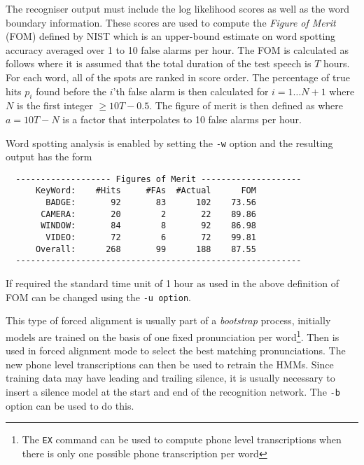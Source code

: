The recogniser output must include the log likelihood scores as
well as the word boundary information.  
These scores are used to compute the \textit{Figure of Merit} (FOM)
defined by NIST which is an upper-bound estimate on word spotting
accuracy averaged over 1 to 10 false alarms per hour.
The FOM is calculated  as follows where it is assumed that the
total duration of the test speech is $T$ hours.  For each word, all of
the spots are ranked in score order.  The percentage of true hits
$p_i$ found before the $i$'th false alarm is then calculated for 
$i = 1 \ldots N+1$ where $N$ is the first integer $\ge 10T - 0.5$.
The figure of merit is then defined as
where $a = 10T - N$ is a factor that interpolates to 10 false
alarms per hour.

Word spotting analysis is enabled by setting the \texttt{-w} option
and the resulting output has the form
\begin{verbatim}
  ------------------- Figures of Merit --------------------
      KeyWord:    #Hits     #FAs  #Actual      FOM
        BADGE:       92       83      102    73.56
       CAMERA:       20        2       22    89.86
       WINDOW:       84        8       92    86.98
        VIDEO:       72        6       72    99.81
      Overall:      268       99      188    87.55
  ---------------------------------------------------------
\end{verbatim}
If required the standard time unit of 1 hour as used in the above
definition of FOM can be changed using the \texttt{-u option}.



This type of forced alignment is usually part of a \textit{bootstrap}
process, initially models are trained on the basis of one fixed
pronunciation per 
word\footnote{
The  \texttt{EX} command can be used to compute phone
level transcriptions when there is only one possible 
phone transcription
per word}.  
Then  is used in forced alignment mode
to select the best matching pronunciations.  The new phone level
transcriptions can then be used to retrain the HMMs.  Since training
data may have leading and trailing silence, it is usually
necessary to insert a silence model at the start and end of the
recognition network.  The  \texttt{-b} option can be used to do this.

